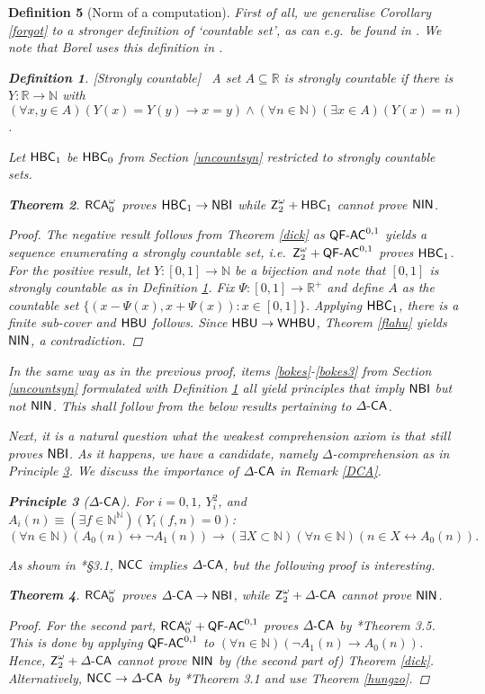 \documentclass[reqno]{amsart}
\newtheorem{thm}{Theorem}
\newtheorem{defi}[thm]{Definition}
\newtheorem{princ}[thm]{Principle}
\def\bdefi{\begin{defi}\rm}
\def\edefi{\end{defi}}
\def\Z{\textup{\textsf{Z}}}
\def\RCAo{\textup{\textsf{RCA}}_{0}^{\omega}}
\def\N{{\mathbb  N}}
\def\R{{\mathbb  R}}
\def\di{\rightarrow}
\def\asa{\leftrightarrow}
\def\QFAC{\textup{\textsf{QF-AC}}}
\def\HBU{\textup{\textsf{HBU}}}
\def\DCA{\Delta\textup{\textsf{-CA}}}
\def\NCC{\textup{\textsf{NCC}}}
\def\NBI{\textup{\textsf{NBI}}}
\def\NIN{\textup{\textsf{NIN}}}
\def\WHBU{\textup{\textsf{WHBU}}}
\def\HBC{\textup{\textsf{HBC}}}
\numberwithin{equation}{section}
\numberwithin{thm}{section}
\begin{document}
\begin{defi}[Norm of a computation]
First of all, we generalise Corollary \ref{forgot} to a stronger definition of `countable set', as can e.g.\ be found in \cite{hrbacekjech}.
We note that Borel uses this definition in \cite{opborrelen2}.
\bdefi[Strongly countable]\label{standard2}~
A set $A\subseteq \R$ is \emph{strongly countable} if there is $Y:\R\di \N$ with $(\forall x, y\in A)(Y(x)=Y(y)\di x=y)\wedge(\forall n\in \N)(\exists x\in A)(Y(x)=n)$. 
\edefi
Let $\HBC_{1}$ be $\HBC_{0}$ from Section \ref{uncountsyn} restricted to strongly countable sets.  
\begin{thm}
$\RCAo$ proves $\HBC_{1}\di \NBI$ while $\Z_{2}^{\omega}+\HBC_{1}$ cannot prove $\NIN$.
\end{thm}
\begin{proof}
The negative result follows from Theorem \ref{dick} as $\QFAC^{0,1}$ yields a sequence enumerating a strongly countable set, i.e.\ $\Z_{2}^{\omega}+\QFAC^{0,1}$ proves $\HBC_{1}$.  
For the positive result, let $Y:[0, 1]\di \N$ be a bijection and note that $[0,1]$ is strongly countable as in Definition \ref{standard2}.
Fix $\Psi:[0,1]\di \R^{+}$ and define $A$ as the countable set $\{ (x-\Psi(x), x+\Psi(x)):x\in [0,1] \}$.   
Applying $\HBC_{1}$, there is a finite sub-cover and $\HBU$ follows.  Since $\HBU\di \WHBU$, Theorem \ref{flahu} yields $\NIN$, a contradiction. 
\end{proof}
In the same way as in the previous proof, items \eqref{bokes}-\eqref{bokes3} from Section \ref{uncountsyn} formulated with Definition \ref{standard2} all yield principles that imply $\NBI$ but not $\NIN$.
This shall follow from the below results pertaining to $\DCA$.

\smallskip

Next, it is a natural question what the weakest comprehension axiom is that still proves $\NBI$.  As it happens,
we have a candidate, namely \emph{$\Delta$-comprehension} as in Principle \ref{DAAS}.
We discuss the importance of $\DCA$ in Remark \ref{DCA}.    
\begin{princ}[$\DCA$]\label{DAAS}
For $i=0, 1$, $Y_{i}^{2}$, and $A_i(n)\equiv (\exists f \in \N^\N)(Y_{i}(f,n)=0)$\textup{:}
\[
(\forall n\in \N)(A_0(n) \asa \neg A_1(n))\di (\exists X\subset \N)(\forall n\in \N)(n\in X\asa A_{0}(n)).
\]
\end{princ}
\noindent
As shown in \cite{dagsamIX}*{\S3.1}, $\NCC$ implies $\DCA$, but the following proof is interesting.
\begin{thm}\label{exnihilo}
$\RCAo$ proves $\DCA\di \NBI$, while $\Z_{2}^{\omega}+\DCA$ cannot prove $\NIN$.
\end{thm}
\begin{proof}
For the second part, $\RCAo+\QFAC^{0,1}$ proves $\DCA$ by \cite{samFLO2}*{Theorem 3.5}.  
This is done by applying $\QFAC^{0,1}$ to $(\forall n\in \N)(\neg A_{1}(n)\di  A_{0}(n))$.
Hence, $\Z_{2}^{\omega}+\DCA$ cannot prove $\NIN$ by (the second part of) Theorem \ref{dick}. 
Alternatively, $\NCC\di \DCA$ by \cite{dagsamIX}*{Theorem 3.1} and use Theorem \ref{hungzo}.  


\end{proof}
\end{defi}
\end{document}
